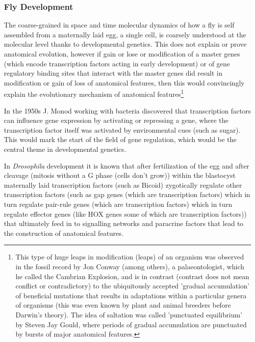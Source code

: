 \subsubsection{Fly Development}

The coarse-grained in space and time molecular dynamics of how a fly is self assembled from a maternally laid egg, a single cell, is coarsely understood at the molecular level thanks to developmental genetics.  This does not explain or prove anatomical evolution, however if gain or lose or modification of a master genes (which encode transcription factors acting in early development) or of gene regulatory binding sites that interact with the master genes did result in modification or gain of loss of anatomical features, then this would convincingly explain the evolutionary mechanism of anatomical features\footnote{This type of huge leaps in modification (leaps) of an organism was observed in the fossil record by Jon Conway (among others), a palaeontologist, which he called the Cambrian Explosion, and is in contrast (contrast does not mean conflict or contradictory) to the ubiquitously accepted 'gradual accumulation' of beneficial mutations that results in adaptations within a particular genera of organisms (this was even known by plant and animal breeders before Darwin's theory).  The idea of saltation was called 'punctuated equilibrium' by Steven Jay Gould, where periods of gradual accumulation are punctuated by bursts of major anatomical features.}  

In the 1950s J. Monod working with bacteria discovered that transcription factors can influence gene expression by activating or repressing a gene, where the transcription factor itself was activated by environmental cues (such as sugar).  This would mark the start of the field of gene regulation, which would be the central theme in developmental genetics.  


In \textit{Drosophila} development it is known that after fertilization of the egg and after cleavage (mitosis without a G phase (cells don't grow)) within the blastocyst maternally laid transcription factors (such as Bicoid) zygotically regulate other transcription factors (such as gap genes (which are transcription factors) which in turn regulate pair-rule genes (which are transcription factors) which in turn regulate effector genes (like HOX genes some of which are transcription factors)) that ultimately feed in to signalling networks and paracrine factors that lead to the construction of anatomical features.  

